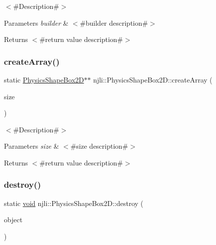 $<$\#\+Description\#$>$


\begin{DoxyParams}{Parameters}
{\em builder} & $<$\#builder description\#$>$\\
\hline
\end{DoxyParams}
\begin{DoxyReturn}{Returns}
$<$\#return value description\#$>$ 
\end{DoxyReturn}
\mbox{\label{classnjli_1_1_physics_shape_box2_d_ad8e533cb22ebf975b57fa5754922ae41}} 
\subsubsection{\texorpdfstring{create\+Array()}{createArray()}}
{\footnotesize\ttfamily static \mbox{\hyperlink{classnjli_1_1_physics_shape_box2_d}{Physics\+Shape\+Box2D}}$\ast$$\ast$ njli\+::\+Physics\+Shape\+Box2\+D\+::create\+Array (\begin{DoxyParamCaption}\item[{const \mbox{\hyperlink{_util_8h_a10e94b422ef0c20dcdec20d31a1f5049}{u32}}}]{size }\end{DoxyParamCaption})\hspace{0.3cm}{\ttfamily [static]}}

$<$\#\+Description\#$>$


\begin{DoxyParams}{Parameters}
{\em size} & $<$\#size description\#$>$\\
\hline
\end{DoxyParams}
\begin{DoxyReturn}{Returns}
$<$\#return value description\#$>$ 
\end{DoxyReturn}
\mbox{\label{classnjli_1_1_physics_shape_box2_d_a673615f3b7ae376a2c3baddc97df5f4a}} 
\subsubsection{\texorpdfstring{destroy()}{destroy()}}
{\footnotesize\ttfamily static \mbox{\hyperlink{_thread_8h_af1e856da2e658414cb2456cb6f7ebc66}{void}} njli\+::\+Physics\+Shape\+Box2\+D\+::destroy (\begin{DoxyParamCaption}\item[{\mbox{\hyperlink{classnjli_1_1_physics_shape_box2_d}{Physics\+Shape\+Box2D}} $\ast$}]{object }\end{DoxyParamCaption})\hspace{0.3cm}{\ttfamily [static]}}

